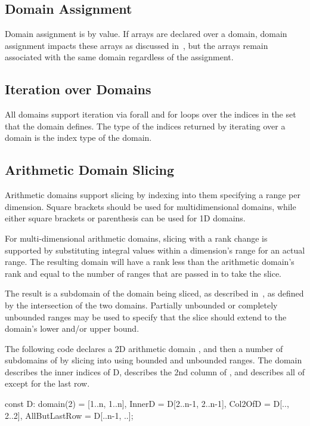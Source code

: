 
\subsection{Domain Assignment}
\label{Domain_Assignment}

Domain assignment is by value.  If arrays are declared over a domain,
domain assignment impacts these arrays as discussed
in~, but the arrays remain
associated with the same domain regardless of the assignment.


\subsection{Iteration over Domains}
\label{Iteration_over_Domains}

All domains support iteration via forall and for loops over the
indices in the set that the domain defines.  The type of the indices
returned by iterating over a domain is the index type of the domain.


\subsection{Arithmetic Domain Slicing}
\label{Arithmetic_Domain_Slicing}

Arithmetic domains support slicing by indexing into them specifying a
range per dimension.  Square brackets should be used for
multidimensional domains, while either square brackets or parenthesis
can be used for 1D domains.  

For multi-dimensional arithmetic domains, slicing with a rank change
is supported by substituting integral values within a dimension's
range for an actual range.  The resulting domain will have a rank less
than the arithmetic domain's rank and equal to the number of ranges
that are passed in to take the slice.

The result is a subdomain of the domain being sliced, as described
in~, as defined by the intersection of the two
domains.  Partially unbounded or completely unbounded ranges may be
used to specify that the slice should extend to the domain's lower
and/or upper bound.

\begin{example}
The following code declares a 2D arithmetic domain , and then
a number of subdomains of  by slicing into  using
bounded and unbounded ranges.  The  domain describes the
inner indices of D,  describes the 2nd column of
, and  describes all of  except
for the last row.

\begin{chapel}
const D: domain(2) = [1..n, 1..n],
      InnerD = D[2..n-1, 2..n-1],
      Col2OfD = D[.., 2..2],
      AllButLastRow = D[..n-1, ..];
\end{chapel}
\end{example}


